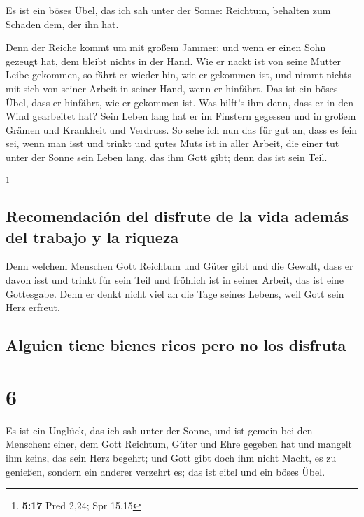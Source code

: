  Es ist ein böses Übel, das ich sah unter der Sonne:
Reichtum, behalten zum Schaden dem, der ihn hat.

 Denn der Reiche kommt um mit großem Jammer; und wenn er
einen Sohn gezeugt hat, dem bleibt nichts in der Hand. 
Wie er nackt ist von seine Mutter Leibe gekommen, so fährt er wieder
hin, wie er gekommen ist, und nimmt nichts mit sich von seiner Arbeit in
seiner Hand, wenn er hinfährt.  Das ist ein böses Übel,
dass er hinfährt, wie er gekommen ist. Was hilft's ihm denn, dass er in
den Wind gearbeitet hat?  Sein Leben lang hat er im
Finstern gegessen und in großem Grämen und Krankheit und Verdruss.
 So sehe ich nun das für gut an, dass es fein sei, wenn
man isst und trinkt und gutes Muts ist in aller Arbeit, die einer tut
unter der Sonne sein Leben lang, das ihm Gott gibt; denn das ist sein
Teil.

\footnote{\textbf{5:17} Pred 2,24; Spr 15,15}

\hypertarget{recomendaciuxf3n-del-disfrute-de-la-vida-ademuxe1s-del-trabajo-y-la-riqueza}{%
\subsection{Recomendación del disfrute de la vida además del trabajo y
la
riqueza}\label{recomendaciuxf3n-del-disfrute-de-la-vida-ademuxe1s-del-trabajo-y-la-riqueza}}

 Denn welchem Menschen Gott Reichtum und Güter gibt und
die Gewalt, dass er davon isst und trinkt für sein Teil und fröhlich ist
in seiner Arbeit, das ist eine Gottesgabe.  Denn er denkt
nicht viel an die Tage seines Lebens, weil Gott sein Herz erfreut.

\hypertarget{alguien-tiene-bienes-ricos-pero-no-los-disfruta}{%
\subsection{Alguien tiene bienes ricos pero no los
disfruta}\label{alguien-tiene-bienes-ricos-pero-no-los-disfruta}}

\hypertarget{section-5}{%
\section{6}\label{section-5}}

 Es ist ein Unglück, das ich sah unter der Sonne, und ist
gemein bei den Menschen:  einer, dem Gott Reichtum, Güter
und Ehre gegeben hat und mangelt ihm keins, das sein Herz begehrt; und
Gott gibt doch ihm nicht Macht, es zu genießen, sondern ein anderer
verzehrt es; das ist eitel und ein böses Übel.

